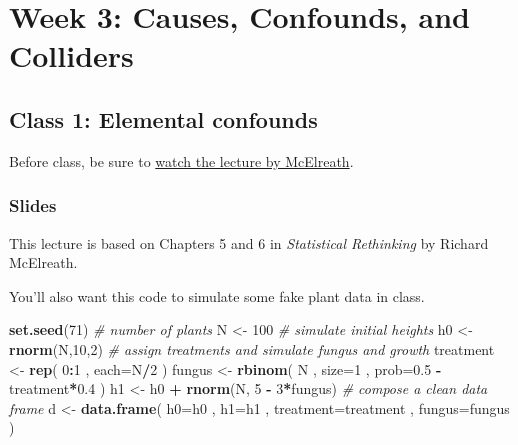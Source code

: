 \documentclass[
]{book}
\newenvironment{Shaded}{\begin{snugshade}}{\end{snugshade}}
\newcommand{\AttributeTok}[1]{\textcolor[rgb]{0.13,0.29,0.53}{#1}}
\newcommand{\CommentTok}[1]{\textcolor[rgb]{0.56,0.35,0.01}{\textit{#1}}}
\newcommand{\DecValTok}[1]{\textcolor[rgb]{0.00,0.00,0.81}{#1}}
\newcommand{\FloatTok}[1]{\textcolor[rgb]{0.00,0.00,0.81}{#1}}
\newcommand{\FunctionTok}[1]{\textcolor[rgb]{0.13,0.29,0.53}{\textbf{#1}}}
\newcommand{\NormalTok}[1]{#1}
\newcommand{\OtherTok}[1]{\textcolor[rgb]{0.56,0.35,0.01}{#1}}
\newcommand{\SpecialCharTok}[1]{\textcolor[rgb]{0.81,0.36,0.00}{\textbf{#1}}}
\begin{document}
\chapter{Week 3: Causes, Confounds, and Colliders}\label{week-3-causes-confounds-and-colliders}

\section{Class 1: Elemental confounds}\label{class-1-elemental-confounds}

Before class, be sure to \href{https://www.youtube.com/watch?v=mBEA7PKDmiY&list=PLDcUM9US4XdPz-KxHM4XHt7uUVGWWVSus&index=5}{watch the lecture by McElreath}.

\subsection{Slides}\label{slides-3}

This lecture is based on Chapters 5 and 6 in \emph{Statistical Rethinking} by Richard McElreath.

You'll also want this code to simulate some fake plant data in class.

\begin{Shaded}
\begin{Highlighting}[]
\FunctionTok{set.seed}\NormalTok{(}\DecValTok{71}\NormalTok{)}
\CommentTok{\# number of plants}
\NormalTok{N }\OtherTok{\textless{}{-}} \DecValTok{100}
\CommentTok{\# simulate initial heights}
\NormalTok{h0 }\OtherTok{\textless{}{-}} \FunctionTok{rnorm}\NormalTok{(N,}\DecValTok{10}\NormalTok{,}\DecValTok{2}\NormalTok{)}
\CommentTok{\# assign treatments and simulate fungus and growth}
\NormalTok{treatment }\OtherTok{\textless{}{-}} \FunctionTok{rep}\NormalTok{( }\DecValTok{0}\SpecialCharTok{:}\DecValTok{1}\NormalTok{ , }\AttributeTok{each=}\NormalTok{N}\SpecialCharTok{/}\DecValTok{2}\NormalTok{ )}
\NormalTok{fungus }\OtherTok{\textless{}{-}} \FunctionTok{rbinom}\NormalTok{( N , }\AttributeTok{size=}\DecValTok{1}\NormalTok{ , }\AttributeTok{prob=}\FloatTok{0.5} \SpecialCharTok{{-}}\NormalTok{ treatment}\SpecialCharTok{*}\FloatTok{0.4}\NormalTok{ )}
\NormalTok{h1 }\OtherTok{\textless{}{-}}\NormalTok{ h0 }\SpecialCharTok{+} \FunctionTok{rnorm}\NormalTok{(N, }\DecValTok{5} \SpecialCharTok{{-}} \DecValTok{3}\SpecialCharTok{*}\NormalTok{fungus)}
\CommentTok{\# compose a clean data frame}
\NormalTok{d }\OtherTok{\textless{}{-}} \FunctionTok{data.frame}\NormalTok{( }\AttributeTok{h0=}\NormalTok{h0 , }\AttributeTok{h1=}\NormalTok{h1 , }\AttributeTok{treatment=}\NormalTok{treatment , }\AttributeTok{fungus=}\NormalTok{fungus )}
\end{Highlighting}
\end{Shaded}
\end{document}
